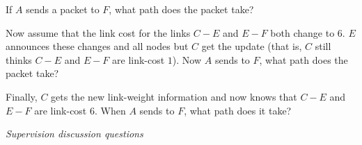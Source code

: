 \documentclass{supervision}
\begin{document}
\begin{questions}
\begin{parts}
\begin{subparts}
              \subpart If $A$ sends a packet to $F$, what path does the packet
                take?

              \subpart Now assume that the link cost for the links $C-E$ and
                $E-F$ both change to $6$. $E$ announces these changes and all
                nodes but $C$ get the update (that is, $C$ still thinks $C-E$
                and $E-F$ are link-cost $1$). Now $A$ sends to $F$, what path
                does the packet take?

              \subpart Finally, $C$ gets the new link-weight information and
                now knows that $C-E$ and $E-F$ are link-cost $6$. When $A$
                sends to $F$, what path does it take?

            \end{subparts}
        \end{parts}
      \question \textit{Supervision discussion questions}
\end{questions}
\end{document}
